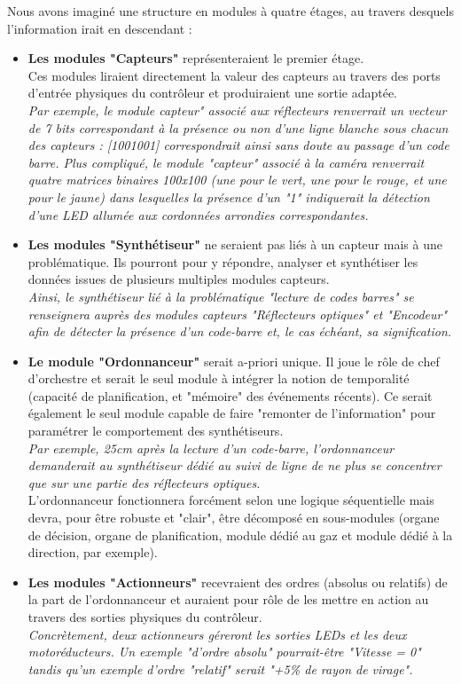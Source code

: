 		Nous avons imaginé une structure en modules à quatre étages, au travers desquels l'information irait en descendant :

		\begin{itemize}
			\item \textbf{Les modules "Capteurs"} représenteraient le premier étage.\\
			Ces modules liraient directement la valeur des capteurs au travers des ports d'entrée physiques du contrôleur et produiraient une sortie adaptée.\\
			\textit{Par exemple, le module capteur" associé aux réflecteurs renverrait un vecteur de 7 bits correspondant à la présence ou non d'une ligne blanche sous chacun des capteurs : [1001001] correspondrait ainsi sans doute au passage d'un code barre. Plus compliqué, le module "capteur" associé à la caméra renverrait quatre matrices binaires 100x100 (une pour le vert, une pour le rouge, et une pour le jaune) dans lesquelles la présence d'un "1" indiquerait la détection d'une LED allumée aux cordonnées arrondies correspondantes.}
			\item \textbf{Les modules "Synthétiseur"} ne seraient pas liés à un capteur mais à une problématique. Ils pourront pour y répondre, analyser et synthétiser les données issues de plusieurs multiples modules capteurs.\\
			\textit{Ainsi, le synthétiseur lié à la problématique "lecture de codes barres" se renseignera auprès des modules capteurs "Réflecteurs optiques" et "Encodeur" afin de détecter la présence d'un code-barre et, le cas échéant, sa signification.}
			\item \textbf{Le module "Ordonnanceur"} serait a-priori unique. Il joue le rôle de chef d'orchestre et serait le seul module à intégrer la notion de temporalité (capacité de planification, et "mémoire" des événements récents). Ce serait également le seul module capable de faire "remonter de l'information" pour paramétrer le comportement des synthétiseurs.\\
			\textit{Par exemple, 25cm après la lecture d'un code-barre, l'ordonnanceur demanderait au synthétiseur dédié au suivi de ligne de ne plus se concentrer que sur une partie des réflecteurs optiques.}\\
			L'ordonnanceur fonctionnera forcément selon une logique séquentielle mais devra, pour être robuste et "clair", être décomposé en sous-modules (organe de décision, organe de planification, module dédié au gaz et module dédié à la direction, par exemple).
			\item \textbf{Les modules "Actionneurs"} recevraient des ordres (absolus ou relatifs) de la part de l'ordonnanceur et auraient pour rôle de les mettre en action au travers des sorties physiques du contrôleur.\\
			\textit{Concrètement, deux actionneurs géreront les sorties LEDs et les deux motoréducteurs. Un exemple "d'ordre absolu" pourrait-être "Vitesse = 0" tandis qu'un exemple d'ordre "relatif" serait "+5\% de rayon de virage".}
		\end{itemize}

